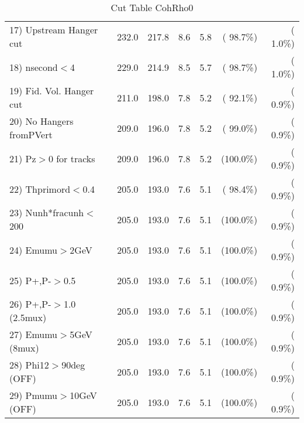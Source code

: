 \begin{table}[h!]
\begin{tabular}{||l||r|r|r|r|r|r||}
 17) Upstream Hanger cut  &        232.0 &        217.8 &          8.6 &          5.8 & ( 98.7\%) & (  1.0\%) \\
 18) nsecond$<$4          &        229.0 &        214.9 &          8.5 &          5.7 & ( 98.7\%) & (  1.0\%) \\
 19) Fid. Vol. Hanger cut &        211.0 &        198.0 &          7.8 &          5.2 & ( 92.1\%) & (  0.9\%) \\
 20) No Hangers fromPVert &        209.0 &        196.0 &          7.8 &          5.2 & ( 99.0\%) & (  0.9\%) \\
 21) Pz$>$0 for tracks    &        209.0 &        196.0 &          7.8 &          5.2 & (100.0\%) & (  0.9\%) \\
 22) Thprimord$<$0.4      &        205.0 &        193.0 &          7.6 &          5.1 & ( 98.4\%) & (  0.9\%) \\
 23) Nunh*fracunh$<$200   &        205.0 &        193.0 &          7.6 &          5.1 & (100.0\%) & (  0.9\%) \\
 24) Emumu$>$2GeV         &        205.0 &        193.0 &          7.6 &          5.1 & (100.0\%) & (  0.9\%) \\
 25) P+,P-$>$0.5          &        205.0 &        193.0 &          7.6 &          5.1 & (100.0\%) & (  0.9\%) \\
 26) P+,P-$>$1.0 (2.5mux) &        205.0 &        193.0 &          7.6 &          5.1 & (100.0\%) & (  0.9\%) \\
 27) Emumu$>$5GeV  (8mux) &        205.0 &        193.0 &          7.6 &          5.1 & (100.0\%) & (  0.9\%) \\
 28) Phi12$>$90deg  (OFF) &        205.0 &        193.0 &          7.6 &          5.1 & (100.0\%) & (  0.9\%) \\
 29) Pmumu$>$10GeV  (OFF) &        205.0 &        193.0 &          7.6 &          5.1 & (100.0\%) & (  0.9\%) \\
 \hline
 \hline
 \end{tabular}
 \caption{Cut Table  CohRho0  }
 \label{tab-cutcohjpsi-mumu_cohrho0}
 \end{table}
